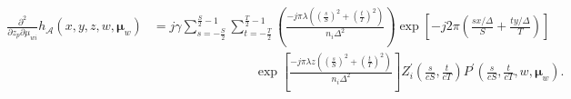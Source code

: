 \documentclass[letter, 11pt]{article}
\begin{document}
\begin{align*}
    \begin{split}
    		\frac{\partial^{2}}{\partial z_{p} \partial \mu_{wi}} h_{\mathcal{A}} (x, y, z, w, \boldsymbol{\mu}_{w}) &= 
		j \gamma \sum\limits_{s = - \frac{S}{2} }^{\frac{S}{2} - 1} \sum\limits_{t = - \frac{T}{2} }^{\frac{T}{2} - 1} 
		\left( \frac{- j \pi \lambda ( { \left( \frac{s}{S} \right) }^{2} + {\left( \frac{t}{T} \right)}^{2} ) }
		{ n_{i} \Delta^{2} } \right) \exp \left[ - j 2 \pi \left( \frac{s x / \Delta}{S} + \frac{t y / \Delta }{T} \right) \right] \\
		& \qquad \qquad \qquad \qquad  
		\exp \left[ \frac{- j \pi \lambda z ( { \left( \frac{s}{S} \right) }^2 + {\left( \frac{t}{T} \right)}^2 ) }{ n_i \Delta^2 } \right] 
		Z_i^{\prime} {\left( \frac{s}{cS}, \frac{t}{cT} \right)} P^{\prime} {\left( \frac{s}{cS}, \frac{t}{cT}, w, \boldsymbol{\mu}_{w} \right)}.
    \end{split}
\end{align*}
\end{document}
